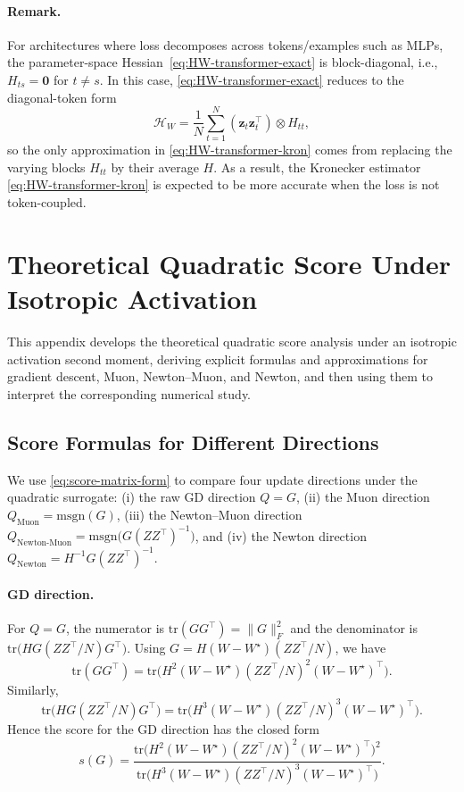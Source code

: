 \documentclass[11pt]{article}
\begin{document}
\paragraph{Remark.} 
For architectures where loss decomposes across tokens/examples such as MLPs, the parameter-space Hessian~\eqref{eq:HW-transformer-exact} is block-diagonal, i.e., ${H}_{ts}=\mathbf{0}$ for $t\neq s$.
In this case, \eqref{eq:HW-transformer-exact} reduces to the diagonal-token form
\[
  {\mathcal{H}}_{{W}}
  =
  \frac{1}{N}\sum_{t=1}^N (\boldsymbol{z}_t \boldsymbol{z}_t^\top)\otimes {H}_{tt},
\]
so the only approximation in \eqref{eq:HW-transformer-kron} comes from replacing the varying blocks ${H}_{tt}$ by their average ${H}$.
As a result, the Kronecker estimator \eqref{eq:HW-transformer-kron} is expected to be more accurate when the loss is not token-coupled.


\section{Theoretical Quadratic Score Under Isotropic Activation}
\label{app:quadratic-score}
This appendix develops the theoretical quadratic score analysis under an isotropic activation second moment, deriving explicit formulas and approximations for gradient descent, Muon, Newton--Muon, and Newton, and then using them to interpret the corresponding numerical study.

\subsection{Score Formulas for Different Directions}
\label{app:score-formulas}

We use \eqref{eq:score-matrix-form} to compare four update directions under the quadratic surrogate:
(i) the raw GD direction ${Q}={G}$, (ii) the Muon direction ${Q}_{\mathrm{Muon}}=\mathrm{msgn}({G})$, (iii) the Newton--Muon direction ${Q}_{\mathrm{Newton\text{-}Muon}}=\mathrm{msgn}\big({G}({Z}{Z}^\top)^{-1}\big)$, and (iv) the Newton direction ${Q}_{\mathrm{Newton}}={H}^{-1}{G}({Z}{Z}^\top)^{-1}$.

\paragraph{GD direction.}
For ${Q}={G}$, the numerator is $\mathrm{tr}({G}{G}^\top)=\|{G}\|_F^2$ and the denominator is
$\mathrm{tr} \big({H} {G} ({Z}{Z}^\top/N) {G}^\top\big)$. Using ${G}={H} ({W}-W^\star) ({Z}{Z}^\top/N)$,
we have
\[
  \mathrm{tr}({G}{G}^\top)
   = 
  \mathrm{tr} \Big({H}^2 ({W}-W^\star) ({Z}{Z}^\top/N)^2 ({W}-W^\star)^\top\Big).
\]
Similarly,
\[
  \mathrm{tr} \big({H} {G} ({Z}{Z}^\top/N) {G}^\top\big)
   = 
  \mathrm{tr} \Big({H}^3 ({W}-W^\star) ({Z}{Z}^\top/N)^3 ({W}-W^\star)^\top\Big).
\]
Hence the score for the GD direction has the closed form
\begin{equation}
  \label{eq:score-grad-deterministic}
  s ({G})
   = 
  \frac{
    \mathrm{tr} \Big({H}^2 ({W}-W^\star) ({Z}{Z}^\top/N)^2 ({W}-W^\star)^\top\Big)^2
  }{
    \mathrm{tr} \Big({H}^3 ({W}-W^\star) ({Z}{Z}^\top/N)^3 ({W}-W^\star)^\top\Big)
  }.
\end{equation}
\end{document}

